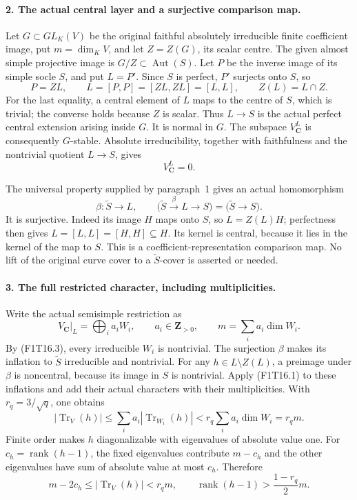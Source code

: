 \paragraph{2. The actual central layer and a surjective comparison map.}
Let \(G\subset GL_K(V)\) be the original faithful
absolutely irreducible finite coefficient image, put
\(m=\dim_KV\), and let \(Z=Z(G)\), its scalar centre.
The given almost simple projective image is
\(G/Z\subset\operatorname{Aut}(S)\). Let \(P\) be the
inverse image of its simple socle \(S\), and put \(L=P'\).
Since \(S\) is perfect, \(P'\) surjects onto \(S\), so
\[
 P=ZL,\qquad
 L=[P,P]=[ZL,ZL]=[L,L],\qquad
 Z(L)=L\cap Z.
 \tag{F1T16.2}
\]
For the last equality, a central element of \(L\) maps
to the centre of \(S\), which is trivial; the converse
holds because \(Z\) is scalar. Thus \(L\to S\) is the
actual perfect central extension arising inside \(G\).
It is normal in \(G\). The subspace
\(V_{\mathbf C}^{L}\) is consequently \(G\)-stable.
Absolute irreducibility, together with faithfulness and
the nontrivial quotient \(L\to S\), gives
\[
                         V_{\mathbf C}^{L}=0.
 \tag{F1T16.3}
\]

The universal property supplied by paragraph~1 gives an
actual homomorphism
\[
 \beta:\widetilde S\longrightarrow L,
 \qquad
 \bigl(\widetilde S\xrightarrow{\beta}L\longrightarrow S\bigr)
       =\bigl(\widetilde S\longrightarrow S\bigr).
 \tag{F1T16.4}
\]
It is surjective. Indeed its image \(H\) maps onto \(S\),
so \(L=Z(L)H\); perfectness then gives
\(L=[L,L]=[H,H]\subseteq H\). Its kernel is central,
because it lies in the kernel of the map to \(S\).
This is a coefficient-representation comparison map.
No lift of the original curve cover to a
\(\widetilde S\)-cover is asserted or needed.

\paragraph{3. The full restricted character, including multiplicities.}
Write the actual semisimple restriction as
\[
 V_{\mathbf C}|_L=\bigoplus_i a_i W_i,
 \qquad a_i\in\mathbf Z_{>0},\qquad
 m=\sum_i a_i\dim W_i.
 \tag{F1T16.5}
\]
By (F1T16.3), every irreducible \(W_i\) is nontrivial.
The surjection \(\beta\) makes its inflation to
\(\widetilde S\) irreducible and nontrivial. For any
\(h\in L\setminus Z(L)\), a preimage under \(\beta\)
is noncentral, because its image in \(S\) is nontrivial.
Apply (F1T16.1) to these inflations and add their actual
characters with their multiplicities. With
\(r_q=3/\sqrt q\), one obtains
\[
 |\operatorname{Tr}_{V}(h)|
 \le\sum_i a_i|\operatorname{Tr}_{W_i}(h)|
 <r_q\sum_i a_i\dim W_i=r_qm.
 \tag{F1T16.6}
\]
Finite order makes \(h\) diagonalizable with eigenvalues
of absolute value one. For
\(c_h=\operatorname{rank}(h-1)\), the fixed eigenvalues
contribute \(m-c_h\) and the other eigenvalues have
sum of absolute value at most \(c_h\). Therefore
\[
 m-2c_h\le|\operatorname{Tr}_{V}(h)|<r_qm,
 \qquad
 \operatorname{rank}(h-1)>\frac{1-r_q}{2}m.
 \tag{F1T16.7}
\]

